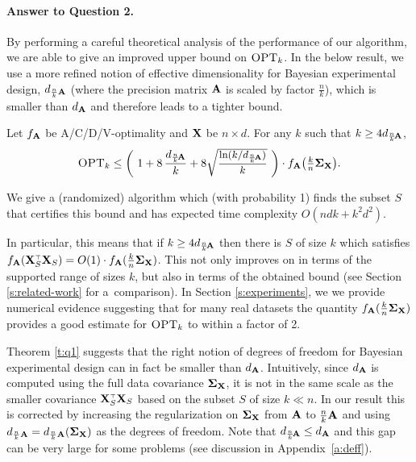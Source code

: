 \documentclass[thesis.tex]{subfiles}
\begin{document}
\paragraph{Answer to Question 2.}
By performing a careful theoretical analysis of the performance of our
algorithm, we are able to give an improved upper bound on ${\textsc{OPT}_k}$. In the below
result, we use a more refined notion of effective dimensionality for
Bayesian experimental design,
$d_{\frac nk\mathbf A}$ (where the precision matrix $\mathbf A$ is scaled by factor $\frac
nk$), which is smaller than $d_\mathbf A$ and therefore leads 
to a tighter bound.
\begin{theorem}\label{t:q1}
  Let $f_{\mathbf A}$ be A/C/D/V-optimality and $\mathbf X$ be
  $n\times d$. For any $k$ such that $k\geq 4d_{\frac
    nk\!\mathbf A}$, %
  \begin{align*}
\opt    \leq \bigg(\ 1+8\,\frac{d_{\frac
    nk\!\A}}{k} + 8\sqrtshort{\frac{\ln (k/d_{\frac nk\!\A})}{k}}\
    \bigg)\cdot f_{\A}\big(\tfrac kn\Sigmab_{\X}\big).
  \end{align*}
\end{theorem}
\begin{remark}
  We give a (randomized) algorithm which (with probability 1) finds
  the subset $S$ that certifies this bound and has expected time
  complexity $O(ndk+k^2d^2)$. 
\end{remark}
  In particular, this means that if $k\geq 4d_{\frac nk\!\mathbf A}$
  then there is $S$ of size $k$
  which satisfies $f_{\A}(\X_S^\top\X_S) = O(1)\cdot f_{\A}(\frac kn\Sigmab_{\X})$.
  This not only improves on \cite{regularized-volume-sampling} in terms
  of the supported range of sizes $k$, but also in terms of the obtained bound (see
  Section \ref{s:related-work} for a~comparison). In Section
  \ref{s:experiments}, we we provide numerical evidence suggesting
  that for many real datasets the quantity $f_{\mathbf A}(\frac
  kn\mathbf{\Sigma}_{\mathbf X})$ provides a good estimate for ${\textsc{OPT}_k}$ to within a
  factor of 2.

Theorem \ref{t:q1} suggests that the right notion of degrees of
freedom for Bayesian experimental design can in fact be smaller
than $d_{\mathbf A}$.  
Intuitively, since $d_{\mathbf A}$ is computed using the full data covariance
$\mathbf{\Sigma}_{\mathbf X}$, it is not in the same scale as the smaller covariance
$\X_S^\top\X_S$ based on the subset $S$ of size $k\ll n$. In our
result this is corrected by increasing the 
regularization on $\mathbf{\Sigma}_\mathbf X$ from $\mathbf A$ to $\frac{n}{k}\mathbf A$ and using
$d_{\frac nk\mathbf A}=d_{\frac{n}{k}\mathbf A}(\mathbf{\Sigma}_\mathbf X)$ as the degrees of
freedom. 
Note that $d_{\frac nk\!\mathbf A}\leq d_{\mathbf A}$ and this gap can be very large for some
problems (see discussion in Appendix~\ref{a:deff}).
\end{document}
